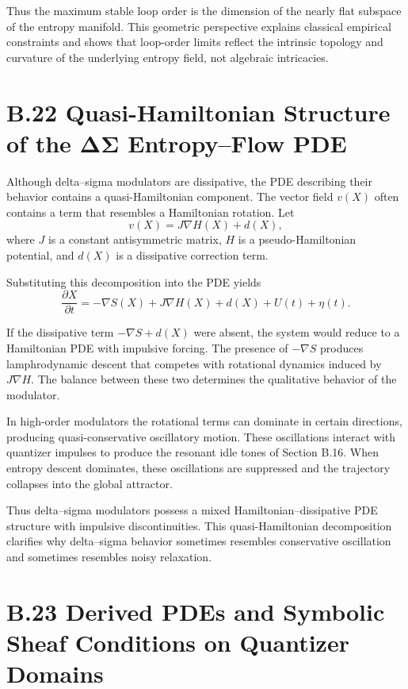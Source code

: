 Thus the maximum stable loop order is the dimension of the nearly flat subspace of the entropy manifold. This geometric perspective explains classical empirical constraints and shows that loop-order limits reflect the intrinsic topology and curvature of the underlying entropy field, not algebraic intricacies.

\section{B.22 Quasi-Hamiltonian Structure of the ΔΣ Entropy–Flow PDE}

Although delta–sigma modulators are dissipative, the PDE describing their behavior contains a quasi-Hamiltonian component. The vector field \(v(X)\) often contains a term that resembles a Hamiltonian rotation. Let
\[
v(X) = J \nabla H(X) + d(X),
\]
where \(J\) is a constant antisymmetric matrix, \(H\) is a pseudo-Hamiltonian potential, and \(d(X)\) is a dissipative correction term.

Substituting this decomposition into the PDE yields
\[
\frac{\partial X}{\partial t}
= -\nabla S(X) + J \nabla H(X) + d(X) + U(t) + \eta(t).
\]

If the dissipative term \(-\nabla S + d(X)\) were absent, the system would reduce to a Hamiltonian PDE with impulsive forcing. The presence of \(-\nabla S\) produces lamphrodynamic descent that competes with rotational dynamics induced by \(J\nabla H\). The balance between these two determines the qualitative behavior of the modulator.

In high-order modulators the rotational terms can dominate in certain directions, producing quasi-conservative oscillatory motion. These oscillations interact with quantizer impulses to produce the resonant idle tones of Section B.16. When entropy descent dominates, these oscillations are suppressed and the trajectory collapses into the global attractor.

Thus delta–sigma modulators possess a mixed Hamiltonian–dissipative PDE structure with impulsive discontinuities. This quasi-Hamiltonian decomposition clarifies why delta–sigma behavior sometimes resembles conservative oscillation and sometimes resembles noisy relaxation.

\section{B.23 Derived PDEs and Symbolic Sheaf Conditions on Quantizer Domains}

